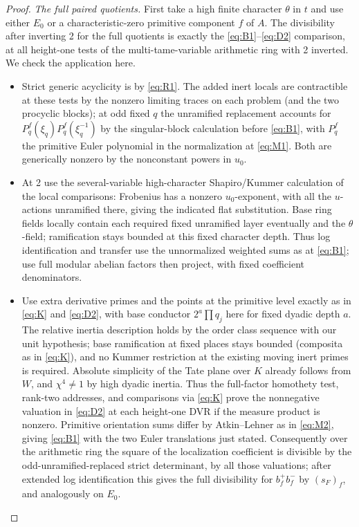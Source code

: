 \begin{proof}
\emph{The full paired quotients.}
First take a high finite character \(\theta\) in \(t\) and use either \(E_0\) or a characteristic-zero primitive component \(f\) of \(A\). The divisibility after inverting 2 for the full quotients is exactly the \eqref{eq:B1}--\eqref{eq:D2} comparison, at all height-one tests of the multi-tame-variable arithmetic ring with 2 inverted. We check the application here.
\begin{itemize}

\item Strict generic acyclicity is by \eqref{eq:R1}. The added inert locals are contractible at these tests by the nonzero limiting traces on each problem (and the two procyclic blocks); at odd fixed \(q\) the unramified replacement accounts for \(P_q^f(\xi_q)P_q^f(\xi_q^{-1})\) by the singular-block calculation before \eqref{eq:B1}, with \(P_q^f\) the primitive Euler polynomial in the normalization at \eqref{eq:M1}. Both are generically nonzero by the nonconstant powers in \(u_0\).
\item At 2 use the several-variable high-character Shapiro/Kummer calculation of the local comparisons: Frobenius has a nonzero \(u_0\)-exponent, with all the \(u\)-actions unramified there, giving the indicated flat substitution. Base ring fields locally contain each required fixed unramified layer eventually and the \(\theta\)-field; ramification stays bounded at this fixed character depth. Thus log identification and transfer use the unnormalized weighted sums as at \eqref{eq:B1}; use full modular abelian factors then project, with fixed coefficient denominators.
\item Use extra derivative primes and the points at the primitive level exactly as in \eqref{eq:K} and \eqref{eq:D2}, with base conductor \(2^a\prod q_j\) here for fixed dyadic depth \(a\). The relative inertia description holds by the order class sequence with our unit hypothesis; base ramification at fixed places stays bounded (composita as in \eqref{eq:K}), and no Kummer restriction at the existing moving inert primes is required. Absolute simplicity of the Tate plane over \(K\) already follows from \(W\), and \(\chi^4\ne1\) by high dyadic inertia. Thus the full-factor homothety test, rank-two addresses, and comparisons via \eqref{eq:K} prove the nonnegative valuation in \eqref{eq:D2} at each height-one DVR if the measure product is nonzero. Primitive orientation sums differ by Atkin--Lehner as in \eqref{eq:M2}, giving \eqref{eq:B1} with the two Euler translations just stated. Consequently over the arithmetic ring the square of the localization coefficient is divisible by the odd-unramified-replaced strict determinant, by all those valuations; after extended log identification this gives the full divisibility for \(b_f^+ b_f^-\) by \((s_F)_f\), and analogously on \(E_0\).
\end{itemize}


\end{proof}
